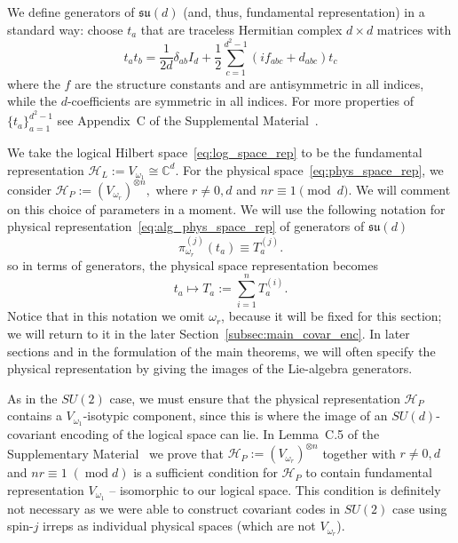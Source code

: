 \documentclass[10pt,twocolumn,superscriptaddress,aps,amsmath,amssymb,citeautoscript,floatfix,prx,longbibliography]{revtex4-2}
\newcounter{alg}
\theoremstyle{plain}
\theoremstyle{plain}
\theoremstyle{plain}
\theoremstyle{plain}
\theoremstyle{plain}
\theoremstyle{plain}
\begin{document}
We define generators of $\mathfrak{su}(d)$ (and, thus, fundamental representation) in a standard way:
choose $t_a$ that are traceless Hermitian complex $d \times d$ matrices with
\begin{equation}
t_a t_b=\frac{1}{2 d} \delta_{a b} I_d+\frac{1}{2} \sum_{c=1}^{d^2-1}\left(i f_{a b c}+d_{a b c}\right) t_c
\end{equation}
where the $f$ are the structure constants and are antisymmetric in all indices, while the $d$-coefficients are symmetric in all indices. For more properties of $\{t_a\}_{a=1}^{d^2-1}$ see  Appendix~C of the Supplemental Material~\cite{SuppMat}.

We take the logical Hilbert space~\eqref{eq:log_space_rep} to be the fundamental representation
$
    \mathcal H_L := V_{\omega_1}\cong \mathbb C^d .
$
For the physical space~\eqref{eq:phys_space_rep}, we consider
$
    \mathcal H_P := (V_{\omega_r})^{\otimes n},
$
where \(r\neq 0,d\) and \(nr\equiv 1\pmod d\). We will comment on this choice of parameters in a moment. 
We will use the following notation for physical representation~\eqref{eq:alg_phys_space_rep} of generators of $\mathfrak{su}(d)$
\[
\pi^{(j)}_{\omega_r}(t_a)\equiv T_a^{(j)}.
\]
so in terms of generators, the physical space representation becomes
\[
    t_a \longmapsto T_a := \sum_{i=1}^n T_a^{(i)}.
\]
Notice that in this notation we omit $\omega_r$, because it will be fixed for this section; we will return to it in the later Section~\ref{subsec:main_covar_enc}. In later sections and in the formulation of the main theorems, we will often specify the physical representation by giving the images of the Lie-algebra generators. 

As in the \(SU(2)\) case, we must ensure that the physical representation \(\mathcal H_P\) contains a \(V_{\omega_1}\)-isotypic component, since this is where the image of an \(SU(d)\)-covariant encoding of the logical space can lie.
In Lemma~C.5 of the Supplementary Material~\cite{SuppMat} we prove that $\mathcal{H}_P:=(V_{\omega_r})^{\otimes n}$ together with $r\neq 0, d$ and $nr\equiv 1\;(\operatorname{mod} d)$ is a sufficient condition for $\mathcal{H}_P$ to contain fundamental representation $V_{\omega_1}$ -- isomorphic to our logical space. This condition is definitely not necessary as we were able to construct covariant codes in $SU(2)$ case using spin-$j$ irreps as individual physical spaces (which are not $V_{\omega_r}$). 
\end{document}
